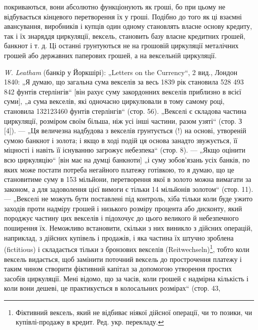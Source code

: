 \parcont{}  %
покриваються, вони абсолютно функціонують як гроші, бо при
цьому не відбувається кінцевого перетворення їх у гроші. Подібно
до того як ці взаємні авансування, виробників і купців
один одному становлять власне основу кредиту, так і їх знаряддя
циркуляції, вексель, становить базу власне кредитних
грошей, банкнот і т. д. Ці останні грунтуються не на грошовій
циркуляції металічних грошей або державних паперових грошей,
а на вексельній циркуляції.

\begin{small}
\noindent{}\emph{W. Leatham} (банкір у Йоркшірі): „Letters on the Currency“, 2 вид., Лондон 1840:
„Я думаю, що загальна сума векселів за весь 1839 рік становила 528 493 842 фунтів
стерлінгів“ [він рахує суму закордонних векселів приблизно в  всієї суми],
„а сума векселів, які одночасно циркулювали в тому самому році, становила
132123460 фунтів стерлінгів“ (стор. 56). „Векселі є складова частина циркуляції,
розміром своїм більша, ніж усі інші частини, разом узяті“ (стор. З [4]). — „Ця
величезна надбудова з векселів грунтується (!) на основі, утвореній сумою
банкнот і золота; і якщо в ході подій ця основа занадто звужується, її міцності
і навіть її існуванню загрожує небезпека“ (стор. 8). — „Якщо оцінити всю
циркуляцію“ [він має на думці банкноти] „і суму зобов’язань усіх банків,
по яких може постати потреба негайного платежу готівкою, то я думаю, що
це становитиме суму в 153 мільйони, перетворення якої в золото можна вимагати
за законом, а для задоволення цієї вимоги є тільки 14 мільйонів золотом“
(стор. 11). — „Векселі не можуть бути поставлені під контроль, хіба тільки
коли буде ужито заходів проти надміру грошей і низького розміру процента
або дисконту, який породжує частину цих векселів і підохочує до цього великого
й небезпечного поширення їх. Неможливо встановити, скільки з них виникло
з дійсних операцій, наприклад, з дійсних купівель і продажів, і яка частина їх
штучно зроблена (fictitious) і складається тільки з бронзових векселів (Reitwechseln)\footnote*{
Фіктивний вексель, який не відбиває ніякої дійсної операції, чи то позики,
чи купівлі-продажу в кредит. Ред. укр. перекладу.
}, тобто коли
вексель видається, щоб замінити поточний вексель до прострочення платежу і таким чином створити
фіктивний капітал за допомогою утворення простих засобів циркуляції. Мені відомо, що за часів, коли
грошей є надмірна кількість і коли вони дешеві, це практикується в колосальних розмірах“ (стор. 43,

\end{small}
